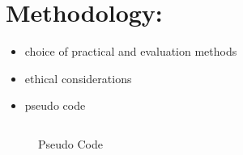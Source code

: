 \clearpage
\section{Methodology:}
\label{sec:meth}
\begin{itemize}
  \item choice of practical and evaluation methods 
  \item ethical considerations
  \item pseudo code 
\end{itemize}

\begin{figure}[h]
\centering
\begin{lstlisting}

\end{lstlisting}
\caption{Pseudo Code}
\label{sc:PseudoCode}
\end{figure}